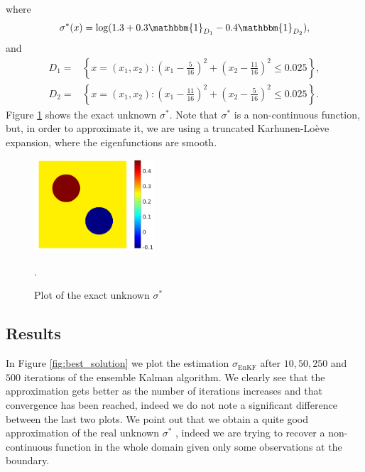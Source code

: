 \documentclass[10pt]{article}
\begin{document}
where
\begin{equation*}
\sigma^*(x) = \log (1.3 + 0.3 \mathbbm{1}_{D_1} - 0.4 \mathbbm{1}_{D_2}),
\end{equation*}
and
\begin{align*}
D_1 = & \left \{ x = (x_1,x_2) \colon \left ( x_1 - \frac{5}{16} \right )^2 + \left ( x_2 - \frac{11}{16} \right )^2 \le 0.025 \right \}, \\
D_2 = & \left \{ x = (x_1,x_2) \colon \left ( x_1 - \frac{11}{16} \right )^2 + \left ( x_2 - \frac{5}{16} \right )^2 \le 0.025 \right \}.
\end{align*}
Figure \ref{fig:exact_unknown} shows the exact unknown $\sigma^*$. Note that $\sigma^*$ is a non-continuous function, but, in order to approximate it, we are using a truncated Karhunen-Lo\`eve expansion, where the eigenfunctions are smooth.
\begin{figure}[t]
\centering
\includegraphics[width = 0.4\textwidth]{figures/sigma_exact}
\caption{Plot of the exact unknown $\sigma^*$}.
\label{fig:exact_unknown}
\end{figure}

\subsection{Results}

In Figure \ref{fig:best_solution} we plot the estimation $\sigma_{\mathrm{EnKF}}$ after $10, 50, 250$ and $500$ iterations of the ensemble Kalman algorithm. We clearly see that the approximation gets better as the number of iterations increases and that convergence has been reached, indeed we do not note a significant difference between the last two plots. We point out that we obtain a quite good approximation of the real unknown $\sigma^*$ , indeed we are trying to recover a non-continuous function in the whole domain given only some observations at the boundary.
\end{document}

